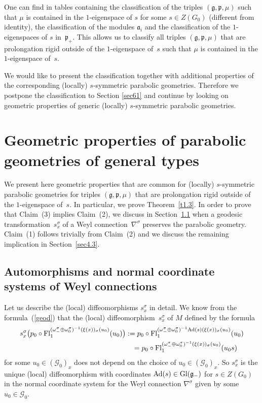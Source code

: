 \documentclass[10pt,a4paper]{amsart}
\newcommand{\om}{\omega}
\newcommand{\si}{\sigma}
\newcommand{\ba}{\mathcal{G}}
\newcommand{\fg}{\mathfrak g}
\newcommand{\fp}{\mathfrak p}
\newcommand{\Ad}{{\rm Ad}}
\newcommand{\Fl}{{\rm Fl}}
\numberwithin{equation}{section}
\begin{document}
One can f\/ind in \cite[Appendix C]{GZ3} tables containing the classif\/ication of the triples $(\fg,\fp,\mu)$ such that $\mu$ is contained in the $1$-eigenspace of $s$ for some $s\in Z(G_0)$ (dif\/ferent from identity), the classif\/ication of the modules $\mathfrak{a}_i$ and the classif\/ication of the $1$-eigenspaces of $s$ in~$\fp_+$. This allows us to classify all triples $(\fg,\fp,\mu)$ that are prolongation rigid outside of the $1$-eigenspace of~$s$ such that $\mu$ is contained in the $1$-eigenspace of~$s$.

We would like to present the classif\/ication together with additional properties of the corresponding (locally) $s$-symmetric parabolic geometries. Therefore we postpone the classif\/ication to Section \ref{sec61} and continue by looking on geometric properties of generic (locally) $s$-symmetric parabolic geometries.

\section{Geometric properties of parabolic geometries of general types} \label{sec3}
We present here geometric properties that are common for (locally) $s$-symmetric parabolic geometries for triples $(\fg,\fp,\mu)$ that are prolongation rigid outside of the $1$-eigenspace of~$s$. In particular, we prove Theorem~\ref{t1.3}. In order to prove that Claim~(3) implies Claim~(2), we discuss in Section~\ref{sec4.1} when a geodesic transformation~$s_x^\si$ of a Weyl connection~$\nabla^\si$ preserves the parabolic geometry. Claim~(1) follows trivially from Claim~(2) and we discuss the remaining implication in Section~\ref{sec4.3}.

\subsection{Automorphisms and normal coordinate systems of Weyl connections}\label{sec4.1}

Let us describe the (local) dif\/feomorphisms $s_x^\si$ in detail. We know from the formula~(\ref{geod}) that the (local) dif\/feomor\-phism~$s^{\si}_x$ of $M$ def\/ined by the formula
\begin{gather}
s^{\si}_x\big(p_0 \circ \Fl^{(\om_-^\si\oplus\om_{0}^\si)^{-1}(\xi(x))_\si(u_0)}_1(u_0)\big): = p_0 \circ \Fl^{(\om_-^\si\oplus\om_{0}^\si)^{-1}\Ad(s)(\xi(x))_\si(u_0)}_1(u_0)\nonumber\\
\hphantom{s^{\si}_x\big(p_0 \circ \Fl^{(\om_-^\si\oplus\om_{0}^\si)^{-1}(\xi(x))_\si(u_0)}_1(u_0)\big)}{}
= p_0 \circ \Fl^{(\om_-^\si\oplus\om_{0}^\si)^{-1}(\xi(x))_\si(u_0)}_1(u_0s)\label{geodf}
\end{gather}
for some $u_0\in (\ba_0)_x$ does not depend on the choice of $u_0\in (\ba_0)_x$. So $s_x^\si$ is the unique (local) dif\/feomorphism with coordinates $\Ad(s)\in {\rm Gl}(\fg_-)$ for $s\in Z(G_0)$ in the normal coordinate system for the Weyl connection $\nabla^\si$ given by some~$u_0\in \ba_0$.
\end{document}
